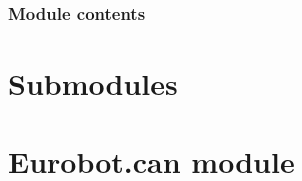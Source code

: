 \documentclass[letterpaper,10pt,english]{sphinxmanual}
\begin{document}
\subsubsection{Module contents}
\label{Eurobot.tests:module-contents}\label{Eurobot.tests:module-Eurobot.tests}

\section{Submodules}
\label{Eurobot:submodules}

\section{Eurobot.can module}
\label{Eurobot:module-Eurobot.can}\label{Eurobot:eurobot-can-module}
\end{document}
